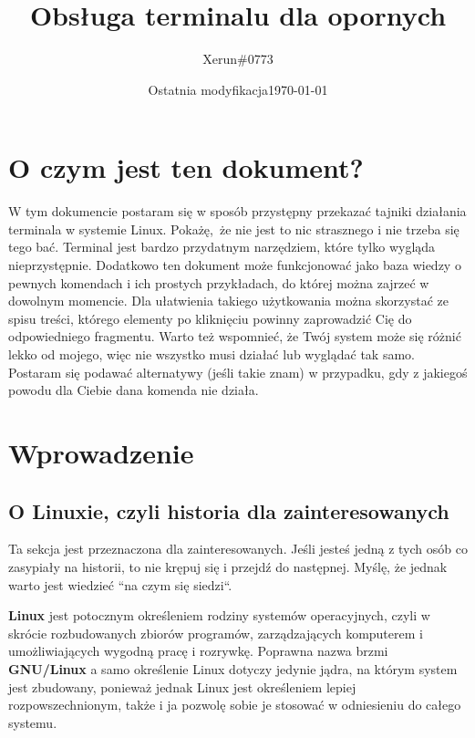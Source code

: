 \documentclass[11pt, a4paper]{article}
\title{Obsługa terminalu dla opornych}
\author{Xerun\#0773}
\date{Ostatnia modyfikacja\break \today}
\begin{document}
\begin{titlepage}
    \null  %
    \nointerlineskip  %
    \vfill
    \let\snewpage \newpage
    \let\newpage \relax
    \maketitle
    \let \newpage \snewpage
    \vfill 
    \break %
\end{titlepage}

\thispagestyle{empty}
\section*{O czym jest ten dokument?}
    W tym dokumencie postaram się w sposób przystępny przekazać tajniki działania terminala w systemie Linux. Pokażę, że nie jest to nic strasznego i nie trzeba się tego bać. Terminal jest bardzo przydatnym narzędziem, które tylko wygląda nieprzystępnie. Dodatkowo ten dokument może funkcjonować jako baza wiedzy o pewnych komendach i ich prostych przykładach, do której można zajrzeć w dowolnym momencie. Dla ułatwienia takiego użytkowania można skorzystać ze spisu treści, którego elementy po kliknięciu powinny zaprowadzić Cię do odpowiedniego fragmentu. Warto też wspomnieć, że Twój system może się różnić lekko od mojego, więc nie wszystko musi działać lub wyglądać tak samo. Postaram się podawać alternatywy (jeśli takie znam) w przypadku, gdy z jakiegoś powodu dla Ciebie dana komenda nie działa.

\newpage
{\hypersetup{hidelinks}\tableofcontents}
\newpage
\section{Wprowadzenie}
\subsection{O Linuxie, czyli historia dla zainteresowanych}

Ta sekcja jest przeznaczona dla zainteresowanych. Jeśli jesteś jedną z tych osób co zasypiały na historii, to nie krępuj się i przejdź do następnej. Myślę, że jednak warto jest wiedzieć ``na czym się siedzi``.

\textbf{Linux} jest potocznym określeniem rodziny systemów operacyjnych, czyli w skrócie rozbudowanych zbiorów programów, zarządzających komputerem i umożliwiających wygodną pracę i rozrywkę. Poprawna nazwa brzmi \textbf{GNU/Linux} a samo określenie Linux dotyczy jedynie jądra, na którym system jest zbudowany, ponieważ jednak Linux jest określeniem lepiej rozpowszechnionym, także i ja pozwolę sobie je stosować w odniesieniu do całego systemu.
\end{document}
